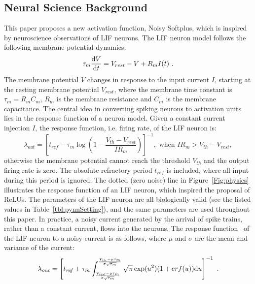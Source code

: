 	
	
	\subsection{Neural Science Background}
	This paper proposes a new activation function, Noisy Softplus, which is inspired by neuroscience observations of LIF neurons.
	The LIF neuron model follows the following membrane potential dynamics:
	\begin{equation}
	\tau_m \frac{\mathrm{d} V}{\mathrm{d} t}=V_{rest} - V + R_{m} I(t) ~.
	\label{eq:LIF_V}
	\end{equation}
	The membrane potential $V$ changes in response to the input current $I$, starting at the resting membrane potential $V_{rest}$, where the membrane time constant is $\tau_m = R_mC_m$, $R_m$ is the membrane resistance and $C_m$ is the membrane capacitance.
	The central idea in converting spiking neurons to activation units lies in the response function of a neuron model.
	Given a constant current injection $I$, the response function, i.e. firing rate, of the LIF neuron is:
	\begin{equation}
	\lambda_\mathit{out}=
	\left [ t_\mathit{ref}-\tau_m\log \left ( 1-\frac{V_{th}-V_\mathit{rest}}{IR_m}  \right )\right ]^{-1}, \textrm{~when~} IR_m>V_{th}-V_{rest},
	\label{equ:consI}
	\end{equation}
	otherwise the membrane potential cannot reach the threshold $V_{th}$ and the output firing rate is zero. 
	The absolute refractory period $t_\mathit{ref}$ is included, where all input during this period is ignored.
	The dotted (zero noise) line in Figure~\ref{Fig:physics} illustrates the response function of an LIF neuron, which inspired the proposal of ReLUs.
	The parameters of the LIF neuron are all biologically valid (see the listed values in Table~\ref{tbl:pynnSetting}), and the same parameters are used throughout this paper.
	In practice, a noisy current generated by the arrival of spike trains, rather than a constant current, flows into the neurons.
	The response function~\cite{la2008response}	of the LIF neuron to a noisy current is as follows, where $\mu$ and $\sigma$ are the mean and variance of the current:
	\begin{equation}
	\lambda_\mathit{out}=
	\left [ t_\mathit{ref}+\tau_m \int_{\frac{V_\mathit{rest}-\mu \tau_m }{\sigma \sqrt{\tau_m}}}^{\frac{V_{th}-\mu \tau_m }{\sigma \sqrt{\tau_m}}} \sqrt{\pi} \exp(u^{2}) (1+erf(u)) \mathrm{d} u \right ]^{-1} ~.
	\label{equ:noiseI}
	\end{equation}
	
